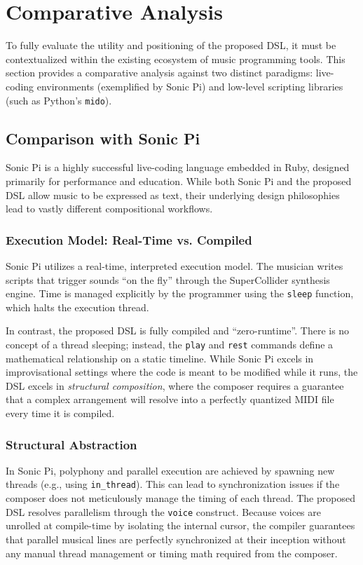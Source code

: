 \section{Comparative Analysis}\label{sec:evaluation-comparative}

To fully evaluate the utility and positioning of the proposed DSL, it must be contextualized within the existing
ecosystem of music programming tools.
This section provides a comparative analysis against two distinct paradigms: live-coding environments (exemplified by
Sonic Pi) and low-level scripting libraries (such as Python's \texttt{mido}).

\subsection{Comparison with Sonic Pi}\label{subsec:comparison-with-sonic-pi}

Sonic Pi is a highly successful live-coding language embedded in Ruby, designed primarily for performance and education.
While both Sonic Pi and the proposed DSL allow music to be expressed as text, their underlying design philosophies lead
to vastly different compositional workflows.

\subsubsection{Execution Model: Real-Time vs. Compiled}
Sonic Pi utilizes a real-time, interpreted execution model.
The musician writes scripts that trigger sounds ``on the fly'' through the SuperCollider synthesis engine.
Time is managed explicitly by the programmer using the \texttt{sleep} function, which halts the execution thread.

In contrast, the proposed DSL is fully compiled and ``zero-runtime''.
There is no concept of a thread sleeping; instead, the \texttt{play} and \texttt{rest} commands define a mathematical
relationship on a static timeline.
While Sonic Pi excels in improvisational settings where the code is meant to be modified while it runs, the DSL excels
in \textit{structural composition}, where the composer requires a guarantee that a complex arrangement will resolve into
a perfectly quantized MIDI file every time it is compiled.

\subsubsection{Structural Abstraction}
In Sonic Pi, polyphony and parallel execution are achieved by spawning new threads (e.g., using \texttt{in\_thread}).
This can lead to synchronization issues if the composer does not meticulously manage the timing of each thread.
The proposed DSL resolves parallelism through the \texttt{voice} construct.
Because voices are unrolled at compile-time by isolating the internal cursor, the compiler guarantees that parallel
musical lines are perfectly synchronized at their inception without any manual thread management or timing math required
from the composer.

